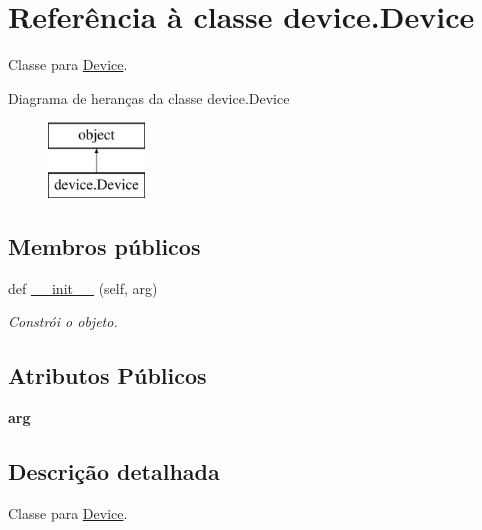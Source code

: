 \hypertarget{classdevice_1_1_device}{}\section{Referência à classe device.\+Device}
\label{classdevice_1_1_device}


Classe para \hyperlink{classdevice_1_1_device}{Device}.  


Diagrama de heranças da classe device.\+Device\begin{figure}[H]
\begin{center}
\leavevmode
\includegraphics[height=2.000000cm]{classdevice_1_1_device}
\end{center}
\end{figure}
\subsection*{Membros públicos}
\begin{DoxyCompactItemize}
\item 
def \hyperlink{classdevice_1_1_device_a6ed267a3bacc28a17a6dc910167b1ca2}{\+\_\+\+\_\+init\+\_\+\+\_\+} (self, arg)
\begin{DoxyCompactList}\small\item\em Constrói o objeto. \end{DoxyCompactList}\end{DoxyCompactItemize}
\subsection*{Atributos Públicos}
\begin{DoxyCompactItemize}
\item 
{\bfseries arg}\hypertarget{classdevice_1_1_device_a0dca5f5fca68b9e9c63e238fbc21c84d}{}\label{classdevice_1_1_device_a0dca5f5fca68b9e9c63e238fbc21c84d}

\end{DoxyCompactItemize}


\subsection{Descrição detalhada}
Classe para \hyperlink{classdevice_1_1_device}{Device}. 


